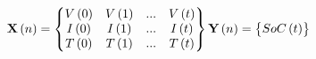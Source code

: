\begin{equation}
    \textbf{X} \left (n  \right ) = 
    \begin{Bmatrix}
        V \left (0  \right ) & V \left (1  \right ) & ... & V \left (t  \right )\\ 
        I \left (0  \right ) & I \left (1  \right ) & ... & I \left (t  \right )\\ 
        T \left (0  \right ) & T \left (1  \right ) & ... & T \left (t  \right )\\
    \end{Bmatrix}
    \\ \textbf{Y} \left (n  \right ) = 
    \begin{Bmatrix}
        SoC \left (t  \right ) 
    \end{Bmatrix}
\label{eq:xy-matrix}
\end{equation}

